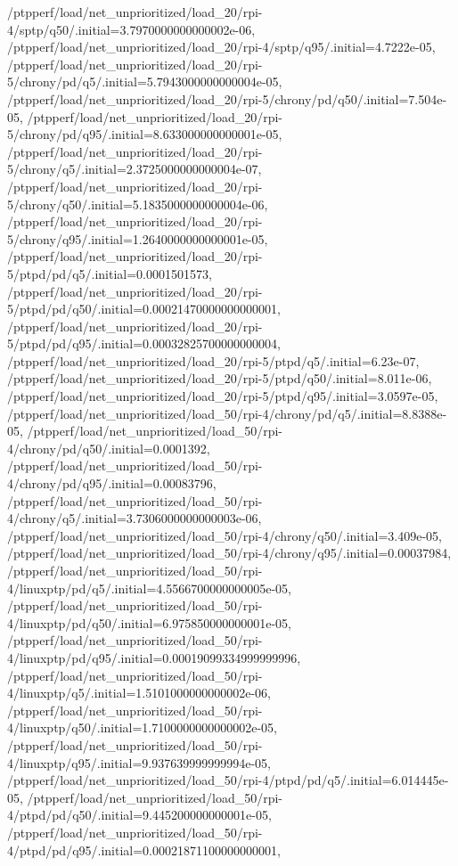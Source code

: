 {    /ptpperf/load/net_unprioritized/load_20/rpi-4/sptp/q50/.initial=3.7970000000000002e-06,
    /ptpperf/load/net_unprioritized/load_20/rpi-4/sptp/q95/.initial=4.7222e-05,
    /ptpperf/load/net_unprioritized/load_20/rpi-5/chrony/pd/q5/.initial=5.7943000000000004e-05,
    /ptpperf/load/net_unprioritized/load_20/rpi-5/chrony/pd/q50/.initial=7.504e-05,
    /ptpperf/load/net_unprioritized/load_20/rpi-5/chrony/pd/q95/.initial=8.633000000000001e-05,
    /ptpperf/load/net_unprioritized/load_20/rpi-5/chrony/q5/.initial=2.3725000000000004e-07,
    /ptpperf/load/net_unprioritized/load_20/rpi-5/chrony/q50/.initial=5.1835000000000004e-06,
    /ptpperf/load/net_unprioritized/load_20/rpi-5/chrony/q95/.initial=1.2640000000000001e-05,
    /ptpperf/load/net_unprioritized/load_20/rpi-5/ptpd/pd/q5/.initial=0.0001501573,
    /ptpperf/load/net_unprioritized/load_20/rpi-5/ptpd/pd/q50/.initial=0.00021470000000000001,
    /ptpperf/load/net_unprioritized/load_20/rpi-5/ptpd/pd/q95/.initial=0.00032825700000000004,
    /ptpperf/load/net_unprioritized/load_20/rpi-5/ptpd/q5/.initial=6.23e-07,
    /ptpperf/load/net_unprioritized/load_20/rpi-5/ptpd/q50/.initial=8.011e-06,
    /ptpperf/load/net_unprioritized/load_20/rpi-5/ptpd/q95/.initial=3.0597e-05,
    /ptpperf/load/net_unprioritized/load_50/rpi-4/chrony/pd/q5/.initial=8.8388e-05,
    /ptpperf/load/net_unprioritized/load_50/rpi-4/chrony/pd/q50/.initial=0.0001392,
    /ptpperf/load/net_unprioritized/load_50/rpi-4/chrony/pd/q95/.initial=0.00083796,
    /ptpperf/load/net_unprioritized/load_50/rpi-4/chrony/q5/.initial=3.7306000000000003e-06,
    /ptpperf/load/net_unprioritized/load_50/rpi-4/chrony/q50/.initial=3.409e-05,
    /ptpperf/load/net_unprioritized/load_50/rpi-4/chrony/q95/.initial=0.00037984,
    /ptpperf/load/net_unprioritized/load_50/rpi-4/linuxptp/pd/q5/.initial=4.5566700000000005e-05,
    /ptpperf/load/net_unprioritized/load_50/rpi-4/linuxptp/pd/q50/.initial=6.975850000000001e-05,
    /ptpperf/load/net_unprioritized/load_50/rpi-4/linuxptp/pd/q95/.initial=0.00019099334999999996,
    /ptpperf/load/net_unprioritized/load_50/rpi-4/linuxptp/q5/.initial=1.5101000000000002e-06,
    /ptpperf/load/net_unprioritized/load_50/rpi-4/linuxptp/q50/.initial=1.7100000000000002e-05,
    /ptpperf/load/net_unprioritized/load_50/rpi-4/linuxptp/q95/.initial=9.937639999999994e-05,
    /ptpperf/load/net_unprioritized/load_50/rpi-4/ptpd/pd/q5/.initial=6.014445e-05,
    /ptpperf/load/net_unprioritized/load_50/rpi-4/ptpd/pd/q50/.initial=9.445200000000001e-05,
    /ptpperf/load/net_unprioritized/load_50/rpi-4/ptpd/pd/q95/.initial=0.00021871100000000001,
}
